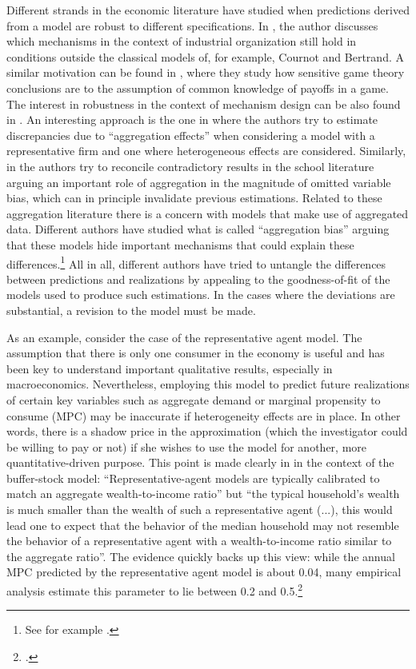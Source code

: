 \documentclass[english, a4paper,12pt]{article}
\begin{document}
Different strands in the economic literature have studied when predictions derived from a model are robust to different specifications. In \cite{SuttonMarketStruct}, the author discusses which mechanisms in the context of industrial organization still hold in conditions outside the classical models of, for example, Cournot and Bertrand. A similar motivation can be found in \cite{Morris97}, where they study how sensitive game theory conclusions are to the assumption of common knowledge of payoffs in a game. The interest in robustness in the context of mechanism design can be also found in \cite{Morris2011}. An interesting approach is the one in \cite{Basu97} where the authors try to estimate discrepancies due to ``aggregation effects'' when considering a model with a representative firm and one where heterogeneous effects are considered. Similarly, in \cite{SchoolAggregation} the authors try to reconcile contradictory results in the school literature arguing an important role of aggregation in the magnitude of omitted variable bias, which can in principle invalidate previous estimations. Related to these aggregation literature there is a concern with models that make use of aggregated data. Different authors have studied what is called ``aggregation bias'' arguing that these models hide important mechanisms that could explain these differences.\footnote{See for example \cite{Agg1, Agg2, Agg3, Agg4}.} All in all, different authors have tried to untangle the differences between predictions and realizations by appealing to the goodness-of-fit of the models used to produce such estimations. In the cases where the deviations are substantial, a revision to the model must be made.

As an example, consider the case of the representative agent model. The assumption that there is only one consumer in the economy is useful and has been key to understand important qualitative results, especially in macroeconomics. Nevertheless, employing this model to predict future realizations of certain key variables such as aggregate demand or marginal propensity to consume (MPC) may be inaccurate if heterogeneity effects are in place. In other words, there is a shadow price in the approximation (which the investigator could be willing to pay or not) if she wishes to use the model for another, more quantitative-driven purpose. This point is made clearly in \cite{CarrollRequiem} in the context of the buffer-stock model: ``Representative-agent models are typically calibrated to match an aggregate wealth-to-income ratio'' but ``the typical household’s wealth is much smaller than the wealth of such a representative agent (...), this would lead one to expect that the behavior of the median household may not resemble the behavior of a representative agent with a wealth-to-income ratio similar to the aggregate ratio''. The evidence quickly backs up this view: while the annual MPC predicted by the representative agent model is about 0.04, many empirical analysis estimate this parameter to lie between 0.2 and 0.5.\footnote{\cite{CarrollRequiem}.} 
\end{document}
